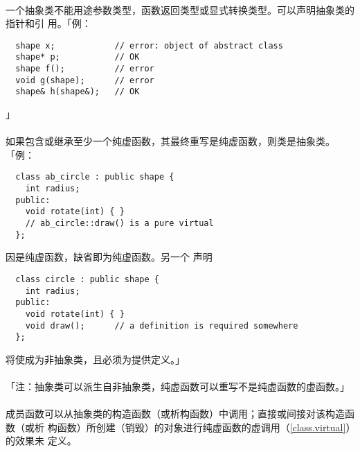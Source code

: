 \paragraph{}
一个抽象类不能用途参数类型，函数返回类型或显式转换类型。可以声明抽象类的指针和引
用。「例：
\begin{lstlisting}
  shape x;            // error: object of abstract class
  shape* p;           // OK
  shape f();          // error
  void g(shape);      // error
  shape& h(shape&);   // OK
\end{lstlisting}」

\paragraph{}
如果包含或继承至少一个纯虚函数，其最终重写是纯虚函数，则类是抽象类。「例：
\begin{lstlisting}
  class ab_circle : public shape {
    int radius;
  public:
    void rotate(int) { }
    // ab_circle::draw() is a pure virtual
  };
\end{lstlisting}
因是纯虚函数，缺省即为纯虚函数。另一个
声明
\begin{lstlisting}
  class circle : public shape {
    int radius;
  public:
    void rotate(int) { }
    void draw();      // a definition is required somewhere
  };
\end{lstlisting}
将使成为非抽象类，且必须为提供定义。」

\paragraph{}
「注：抽象类可以派生自非抽象类，纯虚函数可以重写不是纯虚函数的虚函数。」

\paragraph{}
成员函数可以从抽象类的构造函数（或析构函数）中调用；直接或间接对该构造函数（或析
构函数）所创建（销毁）的对象进行纯虚函数的虚调用（\ref{class.virtual}）的效果未
定义。
